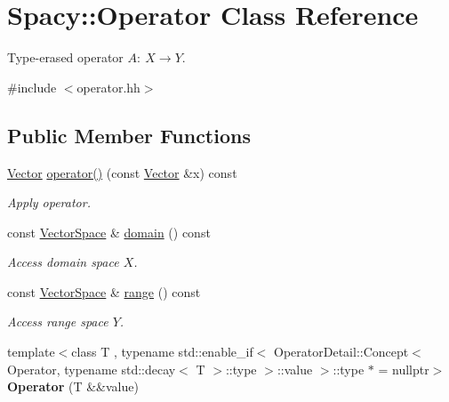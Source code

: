 \hypertarget{classSpacy_1_1Operator}{\section{\-Spacy\-:\-:\-Operator \-Class \-Reference}
\label{classSpacy_1_1Operator}
}


\-Type-\/erased operator $A:\ X \to Y $.  




{\ttfamily \#include $<$operator.\-hh$>$}

\subsection*{\-Public \-Member \-Functions}
\begin{DoxyCompactItemize}
\item 
\hypertarget{classSpacy_1_1Operator_a2ab6072d6f9d98e0d5590531c080e3ad}{\hyperlink{classSpacy_1_1Vector}{\-Vector} \hyperlink{classSpacy_1_1Operator_a2ab6072d6f9d98e0d5590531c080e3ad}{operator()} (const \hyperlink{classSpacy_1_1Vector}{\-Vector} \&x) const }\label{classSpacy_1_1Operator_a2ab6072d6f9d98e0d5590531c080e3ad}

\begin{DoxyCompactList}\small\item\em \-Apply operator. \end{DoxyCompactList}\item 
\hypertarget{classSpacy_1_1Operator_a3b3d457bee48adf00d683a6aec4aa841}{const \hyperlink{classSpacy_1_1VectorSpace}{\-Vector\-Space} \& \hyperlink{classSpacy_1_1Operator_a3b3d457bee48adf00d683a6aec4aa841}{domain} () const }\label{classSpacy_1_1Operator_a3b3d457bee48adf00d683a6aec4aa841}

\begin{DoxyCompactList}\small\item\em \-Access domain space $X$. \end{DoxyCompactList}\item 
\hypertarget{classSpacy_1_1Operator_a8cf3b1e3b6c5c6ab5ddc09224ed8ab24}{const \hyperlink{classSpacy_1_1VectorSpace}{\-Vector\-Space} \& \hyperlink{classSpacy_1_1Operator_a8cf3b1e3b6c5c6ab5ddc09224ed8ab24}{range} () const }\label{classSpacy_1_1Operator_a8cf3b1e3b6c5c6ab5ddc09224ed8ab24}

\begin{DoxyCompactList}\small\item\em \-Access range space $Y$. \end{DoxyCompactList}\item 
\hypertarget{classSpacy_1_1Operator_adfd4cdca1e6d705e9a52a6d3930c83d2}{{\footnotesize template$<$class T , typename std\-::enable\-\_\-if$<$ Operator\-Detail\-::\-Concept$<$ Operator, typename std\-::decay$<$ T $>$\-::type $>$\-::value $>$\-::type $\ast$  = nullptr$>$ }\\{\bfseries \-Operator} (\-T \&\&value)}\label{classSpacy_1_1Operator_adfd4cdca1e6d705e9a52a6d3930c83d2}


\end{DoxyCompactItemize}
